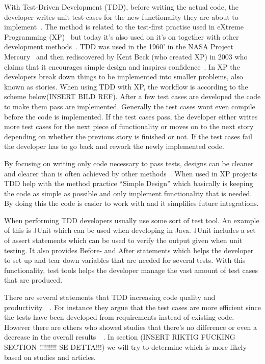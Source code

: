 With Test-Driven Development (TDD), before writing the actual code, the developer writes unit test cases for the new functionality they are about to implement~\cite{beckTestDriven}. The method is related to the test-first practise used in eXtreme Programming (XP)~\cite{beckXP} but today it’s also used on it’s on together with other development methods~\cite{MSNET}. TDD was used in the 1960’ in the NASA Project Mercury~\cite{NASA} and then rediscovered by Kent Beck (who created XP) in 2003 who claims that it encourages simple design and inspires confidence~\cite{beckXP}. In XP the developers break down things to be implemented into smaller problems, also known as stories. When using TDD with XP, the workflow is according to the scheme below(INSERT BILD REF). After a few test cases are developed the code to make them pass are implemented. Generally the test cases wont even compile before the code is implemented. If the test cases pass, the developer either writes more test cases for the next piece of functionality or moves on to the next story depending on whether the previous story is finished or not. If the test cases fail the developer has to go back and rework the newly implemented code.

By focusing on writing only code necessary to pass tests, designs can be cleaner and clearer than is often achieved by other methods~\cite{beckXP}. When used in XP projects TDD help with the method practice “Simple Design” which basically is keeping the code as simple as possible and only implement functionality that is needed. By doing this the code is easier to work with and it simplifies future integrations. 

When performing TDD developers usually use some sort of test tool. An example of this is JUnit which can be used when developing in Java. JUnit includes a set of assert statements which can be used to verify the output given when unit testing. It also provides Before- and After statements which helps the developer to set up and tear down variables that are needed for several tests. With this functionality, test tools helps the developer manage the vast amount of test cases that are produced.

There are several statements that TDD increasing code quality and productivity~\cite{beckXP}~\cite{effectiveTDD}. For instance they argue that the test cases are more efficient since the tests have been developed from requirements instead of existing code. However there are others who showed studies that there’s no difference or even a decrease in the overall results~\cite{tddInvest}~\cite{muller}. In section (INSERT RIKTIG FUCKING SECTION !!!!!!!!! SE DETTA!!!) we will try to determine which is more likely based on studies and articles.